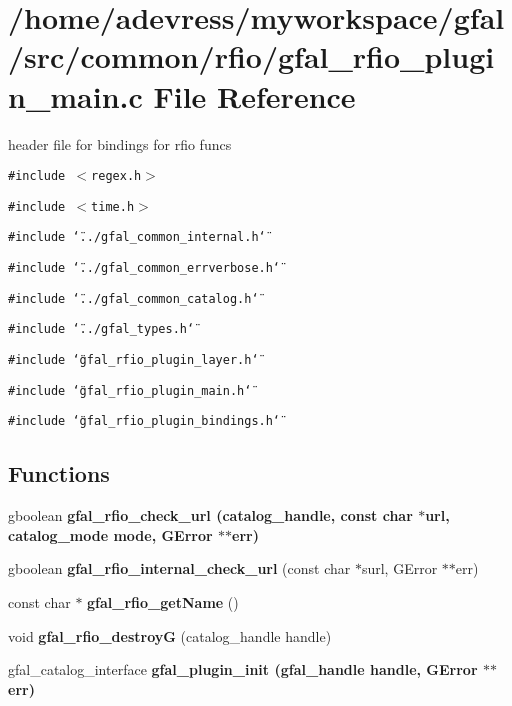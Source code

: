 \section{/home/adevress/myworkspace/gfal/src/common/rfio/gfal\_\-rfio\_\-plugin\_\-main.c File Reference}
\label{gfal__rfio__plugin__main_8c}
header file for bindings for rfio funcs 

{\tt \#include $<$regex.h$>$}\par
{\tt \#include $<$time.h$>$}\par
{\tt \#include \char`\"{}../gfal\_\-common\_\-internal.h\char`\"{}}\par
{\tt \#include \char`\"{}../gfal\_\-common\_\-errverbose.h\char`\"{}}\par
{\tt \#include \char`\"{}../gfal\_\-common\_\-catalog.h\char`\"{}}\par
{\tt \#include \char`\"{}../gfal\_\-types.h\char`\"{}}\par
{\tt \#include \char`\"{}gfal\_\-rfio\_\-plugin\_\-layer.h\char`\"{}}\par
{\tt \#include \char`\"{}gfal\_\-rfio\_\-plugin\_\-main.h\char`\"{}}\par
{\tt \#include \char`\"{}gfal\_\-rfio\_\-plugin\_\-bindings.h\char`\"{}}\par
\subsection*{Functions}
\begin{CompactItemize}
\item 
gboolean \bf{gfal\_\-rfio\_\-check\_\-url} (catalog\_\-handle, const char $\ast$url, catalog\_\-mode mode, GError $\ast$$\ast$err)
\item 
gboolean \textbf{gfal\_\-rfio\_\-internal\_\-check\_\-url} (const char $\ast$surl, GError $\ast$$\ast$err)\label{gfal__rfio__plugin__main_8c_42f38c81dceec6a03f5ef4194bf302de}

\item 
const char $\ast$ \textbf{gfal\_\-rfio\_\-get\-Name} ()\label{gfal__rfio__plugin__main_8c_621cd96c7d439a5ae88cbc03960b3e8d}

\item 
void \textbf{gfal\_\-rfio\_\-destroy\-G} (catalog\_\-handle handle)\label{gfal__rfio__plugin__main_8c_5d5e134df56b9dab9254ac9ba04c7671}

\item 
gfal\_\-catalog\_\-interface \bf{gfal\_\-plugin\_\-init} (gfal\_\-handle handle, GError $\ast$$\ast$err)
\end{CompactItemize}



